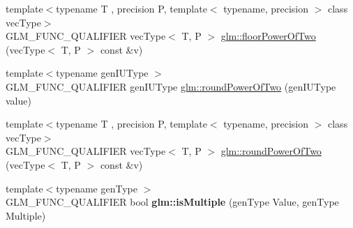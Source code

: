 \begin{DoxyCompactItemize}
\item 
{\footnotesize template$<$typename T , precision P, template$<$ typename, precision $>$ class vec\-Type$>$ }\\G\-L\-M\-\_\-\-F\-U\-N\-C\-\_\-\-Q\-U\-A\-L\-I\-F\-I\-E\-R vec\-Type$<$ T, P $>$ \hyperlink{group__gtc__round_ga6a5a8f6dd1b2f755e4572bd039062c37}{glm\-::floor\-Power\-Of\-Two} (vec\-Type$<$ T, P $>$ const \&v)
\item 
{\footnotesize template$<$typename gen\-I\-U\-Type $>$ }\\G\-L\-M\-\_\-\-F\-U\-N\-C\-\_\-\-Q\-U\-A\-L\-I\-F\-I\-E\-R gen\-I\-U\-Type \hyperlink{group__gtc__round_ga6d24a9e3abe3e6a908661b43acb8efe0}{glm\-::round\-Power\-Of\-Two} (gen\-I\-U\-Type value)
\item 
{\footnotesize template$<$typename T , precision P, template$<$ typename, precision $>$ class vec\-Type$>$ }\\G\-L\-M\-\_\-\-F\-U\-N\-C\-\_\-\-Q\-U\-A\-L\-I\-F\-I\-E\-R vec\-Type$<$ T, P $>$ \hyperlink{group__gtc__round_gae95be3b384f3bbd00c6c1cf0a1f96485}{glm\-::round\-Power\-Of\-Two} (vec\-Type$<$ T, P $>$ const \&v)
\item 
\hypertarget{namespaceglm_a1749b696a2f7a956da67d67a557ae134}{{\footnotesize template$<$typename gen\-Type $>$ }\\G\-L\-M\-\_\-\-F\-U\-N\-C\-\_\-\-Q\-U\-A\-L\-I\-F\-I\-E\-R bool {\bfseries glm\-::is\-Multiple} (gen\-Type Value, gen\-Type Multiple)}\label{namespaceglm_a1749b696a2f7a956da67d67a557ae134}


\end{DoxyCompactItemize}
